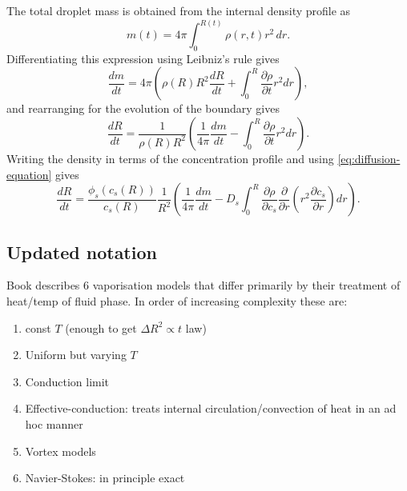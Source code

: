 \documentclass[12pt]{report}
\begin{document}
The total droplet mass is obtained from the internal density profile as
\begin{equation}\label{eq:mass-equation}
  m(t) = 4\pi \int_0^{R(t)} \rho(r,t) r^2 \, dr.
\end{equation}
Differentiating this expression using Leibniz's rule gives
\begin{equation}
  \frac{dm}{dt} = 4\pi \left(
  \rho(R) R^2 \frac{dR}{dt} + \int_0^R \frac{\partial \rho}{\partial t} r^2 dr
  \right),
\end{equation}
and rearranging for the evolution of the boundary gives
\begin{equation}
  \frac{dR}{dt} =
  \frac{1}{\rho(R) R^2} \left(
  \frac{1}{4\pi} \frac{dm}{dt} - \int_0^R \frac{\partial \rho}{\partial t} r^2 dr
  \right).
\end{equation}
Writing the density in terms of the concentration profile and using \eqref{eq:diffusion-equation} gives
\begin{equation}\label{eq:radial-evolution}
  \frac{dR}{dt} =
  \frac{\phi_s(c_s(R))}{c_s(R)} \frac{1}{R^2} \left(
  \frac{1}{4\pi} \frac{dm}{dt} -
  D_s \int_0^R
  \frac{\partial \rho}{\partial c_s}
  \frac{\partial}{\partial r} \left( r^2 \frac{\partial c_s}{\partial r} \right) dr
  \right).
\end{equation}

\subsection{Updated notation}

Book describes 6 vaporisation models that differ primarily by their treatment of heat/temp of fluid phase.
In order of increasing complexity these are:
\begin{enumerate}
\item const $T$ (enough to get $\Delta R^2 \propto t$ law)
\item Uniform but varying $T$
\item Conduction limit
\item Effective-conduction: treats internal circulation/convection of heat in an ad hoc manner
\item Vortex models
\item Navier-Stokes: in principle exact
\end{enumerate}
\end{document}
